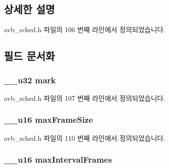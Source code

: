 \subsection{상세한 설명}


avb\+\_\+sched.\+h 파일의 106 번째 라인에서 정의되었습니다.



\subsection{필드 문서화}
\subsubsection[{\texorpdfstring{mark}{mark}}]{\setlength{\rightskip}{0pt plus 5cm}\+\_\+\+\_\+u32 mark}\hypertarget{structtc__avb__sopt_ab6c7e307fa0c23b24f307864779bcbd1}{}\label{structtc__avb__sopt_ab6c7e307fa0c23b24f307864779bcbd1}


avb\+\_\+sched.\+h 파일의 107 번째 라인에서 정의되었습니다.

\subsubsection[{\texorpdfstring{max\+Frame\+Size}{maxFrameSize}}]{\setlength{\rightskip}{0pt plus 5cm}\+\_\+\+\_\+u16 max\+Frame\+Size}\hypertarget{structtc__avb__sopt_ad7df0d5cafcfc25ac44005b19575f04e}{}\label{structtc__avb__sopt_ad7df0d5cafcfc25ac44005b19575f04e}


avb\+\_\+sched.\+h 파일의 110 번째 라인에서 정의되었습니다.

\subsubsection[{\texorpdfstring{max\+Interval\+Frames}{maxIntervalFrames}}]{\setlength{\rightskip}{0pt plus 5cm}\+\_\+\+\_\+u16 max\+Interval\+Frames}\hypertarget{structtc__avb__sopt_a6acc52cd56f8f2c216d8069d6e54a158}{}\label{structtc__avb__sopt_a6acc52cd56f8f2c216d8069d6e54a158}


